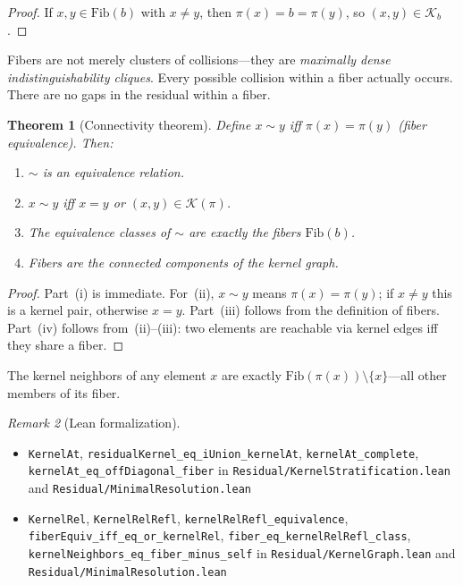 \documentclass[11pt,a4paper]{article}
\theoremstyle{plain}
\newtheorem{theorem}{Theorem}[section]
\theoremstyle{definition}
\theoremstyle{remark}
\newtheorem{remark}[theorem]{Remark}
\newcommand{\compare}{\pi}
\newcommand{\Fib}{\mathrm{Fib}}
\newcommand{\Ker}{\mathcal{K}}
\newcommand{\KerAt}{\mathcal{K}}
\begin{document}
\begin{proof}
If $x, y \in \Fib(b)$ with $x \neq y$, then $\compare(x) = b = \compare(y)$,
so $(x,y) \in \KerAt_b$.
\end{proof}

Fibers are not merely clusters of collisions---they are \emph{maximally dense
indistinguishability cliques}. Every possible collision within a fiber actually
occurs. There are no gaps in the residual within a fiber.

\begin{theorem}[Connectivity theorem]\label{thm:connectivity}
Define $x \sim y$ iff $\compare(x) = \compare(y)$ (fiber equivalence). Then:
\begin{enumerate}[label=(\roman*),nosep]
\item $\sim$ is an equivalence relation.
\item $x \sim y$ iff $x = y$ or $(x,y) \in \Ker(\compare)$.
\item The equivalence classes of $\sim$ are exactly the fibers $\Fib(b)$.
\item Fibers are the connected components of the kernel graph.
\end{enumerate}
\end{theorem}

\begin{proof}
Part~(i) is immediate. For~(ii), $x \sim y$ means $\compare(x) = \compare(y)$;
if $x \neq y$ this is a kernel pair, otherwise $x = y$. Part~(iii) follows from
the definition of fibers. Part~(iv) follows from~(ii)--(iii): two elements are
reachable via kernel edges iff they share a fiber.
\end{proof}

The kernel neighbors of any element $x$ are exactly
$\Fib(\compare(x)) \setminus \{x\}$---all other members of its fiber.

\begin{remark}[Lean formalization]
\leavevmode\par\begin{itemize}[nosep,leftmargin=*,before=\raggedright]
\item \texttt{KernelAt}, \texttt{residualKernel\_eq\_iUnion\_kernelAt}, \texttt{kernelAt\_complete}, \texttt{kernelAt\_eq\_offDiagonal\_fiber} in \texttt{Residual/KernelStratification.lean} and \texttt{Residual/MinimalResolution.lean}
\item \texttt{KernelRel}, \texttt{KernelRelRefl}, \texttt{kernelRelRefl\_equivalence}, \texttt{fiberEquiv\_iff\_eq\_or\_kernelRel}, \texttt{fiber\_eq\_kernelRelRefl\_class}, \texttt{kernelNeighbors\_eq\_fiber\_minus\_self} in \texttt{Residual/KernelGraph.lean} and \texttt{Residual/MinimalResolution.lean}
\end{itemize}
\end{remark}
\end{document}
